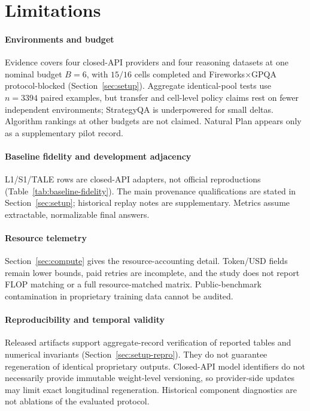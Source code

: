 \section{Limitations}
\label{sec:limitations}

\paragraph{Environments and budget}
Evidence covers four closed-API providers and four reasoning datasets at one nominal budget
$B{=}6$, with $15/16$ cells completed and Fireworks$\times$GPQA protocol-blocked
(Section~\ref{sec:setup}). Aggregate identical-pool tests use $n{=}3394$ paired examples, but
transfer and cell-level policy claims rest on fewer independent environments; StrategyQA is
underpowered for small deltas. Algorithm rankings at other budgets are not claimed. Natural Plan
appears only as a supplementary pilot record.

\paragraph{Baseline fidelity and development adjacency}
L1/S1/TALE rows are closed-API adapters, not official reproductions
(Table~\ref{tab:baseline-fidelity}). The main provenance qualifications are stated in
Section~\ref{sec:setup}; historical replay notes are supplementary.
Metrics assume extractable, normalizable final answers.

\paragraph{Resource telemetry}
Section~\ref{sec:compute} gives the resource-accounting detail. Token/USD fields remain lower
bounds, paid retries are incomplete, and the study does not report FLOP matching or a full
resource-matched matrix. Public-benchmark contamination in proprietary training data cannot be
audited.

\paragraph{Reproducibility and temporal validity}
Released artifacts support aggregate-record verification of reported tables and numerical
invariants (Section~\ref{sec:setup-repro}). They do not guarantee regeneration of identical
proprietary outputs. Closed-API model identifiers do not necessarily provide immutable weight-level
versioning, so provider-side updates may limit exact longitudinal regeneration. Historical component
diagnostics are not ablations of the evaluated protocol.
